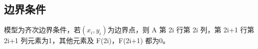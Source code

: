 \documentclass[UTF8,titlepage,twocolumn]{ctexart}
\begin{document}
%
%

\subsection{边界条件}

模型为齐次边界条件，若$(x_i,y_i)$为边界点，则 A 第 2i 行第 2i 列，第 2i+1 行第 2i+1 列元素为1，其他元素及  F(2i)，F(2i+1) 都为0。


%
%
\end{document}
